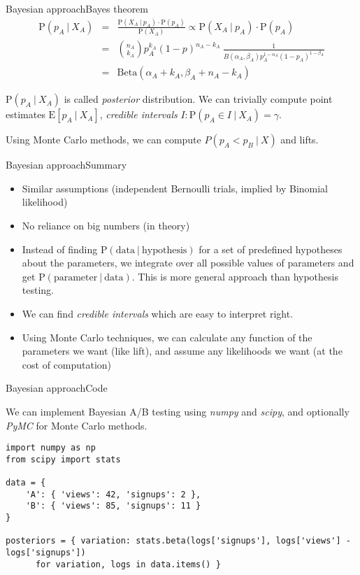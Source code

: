 \documentclass[pdf]{beamer}
\begin{document}
\begin{frame}{Bayesian approach}{Bayes theorem}
	\begin{eqnarray*}
	\text{P}(p_A ~|~ X_A) &=& \frac{\text{P}(X_A ~|~ p_A) \cdot \text{P}(p_A)}{\text{P}(X_A)} \propto \text{P}(X_A ~|~ p_A) \cdot \text{P}(p_A) \\
	&=& {n_A\choose k_A} p_A^{k_A} (1-p)^{n_A - k_A}\ \frac{1}{B(\alpha_A, \beta_A) p_A^{1-\alpha_A} (1-p_A)^{1-\beta_A}} \\
	&=& \text{Beta}(\alpha_A + k_A, \beta_A + n_A - k_A)
	\end{eqnarray*}
	
	$\text{P}(p_A ~|~ X_A)$ is called \emph{posterior} distribution. We can trivially compute point estimates $\text{E}[p_A~|~X_A]$, \emph{credible intervals} $I: \text{P}(p_A \in I~ | ~X_A) = \gamma$. 
	
	Using Monte Carlo methods, we can compute $P(p_A < p_B ~|~ X)$ and lifts.
	
\end{frame}


\begin{frame}{Bayesian approach}{Summary}

	\begin{itemize}
		\item Similar assumptions (independent Bernoulli trials, implied by Binomial likelihood)
		\item No reliance on big numbers (in theory)
		\item Instead of finding $\text{P}(\text{data} ~|~ \text{hypothesis})$ for a set of predefined hypotheses about the parameters, we integrate over all possible values of parameters and get $\text{P}(\text{parameter} ~| ~\text{data})$. This is more general approach than hypothesis testing.
		\item We can find \emph{credible intervals} which are easy to interpret right.
		\item Using Monte Carlo techniques, we can calculate any function of the parameters we want (like lift), and assume any likelihoods we want (at the cost of computation)
	\end{itemize}
\end{frame}


\begin{frame}[fragile]{Bayesian approach}{Code}

	We can implement Bayesian A/B testing using \emph{numpy} and \emph{scipy}, and optionally \emph{PyMC} for Monte Carlo methods.
	
	\begin{lstlisting}
import numpy as np
from scipy import stats

data = {
	'A': { 'views': 42, 'signups': 2 },
	'B': { 'views': 85, 'signups': 11 }
}

posteriors = { variation: stats.beta(logs['signups'], logs['views'] - logs['signups'])
      for variation, logs in data.items() }

	\end{lstlisting}
	
\end{frame}
\end{document}
